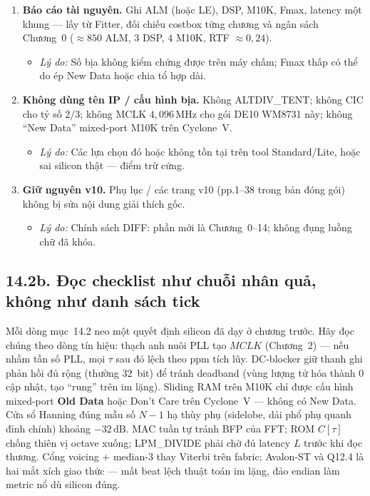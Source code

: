 \begin{enumerate}
\item \textbf{Báo cáo tài nguyên.} Ghi ALM (hoặc LE), DSP, M10K, Fmax, latency một khung --- lấy từ Fitter, đối chiếu costbox từng chương và ngân sách Chương~0 ($\approx 850$ ALM, $3$ DSP, $4$ M10K, RTF $\approx 0{,}24$).
\begin{itemize}[leftmargin=1.2em]
    \item \emph{Lý do:} Số bịa không kiểm chứng được trên máy chấm; Fmax thấp có thể do ép New Data hoặc chia tổ hợp dài.
\end{itemize}

\item \textbf{Không dùng tên IP / cấu hình bịa.} Không ALTDIV\_TENT; không CIC cho tỷ số $2/3$; không MCLK $4{,}096\,\text{MHz}$ cho gói DE10 WM8731 này; không ``New Data'' mixed-port M10K trên Cyclone~V.
\begin{itemize}[leftmargin=1.2em]
    \item \emph{Lý do:} Các lựa chọn đó hoặc không tồn tại trên tool Standard/Lite, hoặc sai silicon thật --- điểm trừ cứng.
\end{itemize}

\item \textbf{Giữ nguyên v10.} Phụ lục / các trang v10 (pp.1--38 trong bản đóng gói) không bị sửa nội dung giải thích gốc.
\begin{itemize}[leftmargin=1.2em]
    \item \emph{Lý do:} Chính sách DIFF: phần mới là Chương~0--14; không đụng luồng chữ đã khóa.
\end{itemize}
\end{enumerate}


\subsection*{14.2b. Đọc checklist như chuỗi nhân quả, không như danh sách tick}

Mỗi dòng mục~14.2 neo một quyết định silicon đã dạy ở chương trước. Hãy đọc chúng theo dòng tín hiệu: thạch anh nuôi PLL tạo $MCLK$ (Chương~2) --- nếu nhầm tần số PLL, mọi $\tau$ sau đó lệch theo ppm tích lũy. DC-blocker giữ thanh ghi phản hồi đủ rộng (thường $32$~bit) để tránh deadband (vùng lượng tử hóa thành $0$ cập nhật, tạo ``rung'' trên im lặng). Sliding RAM trên M10K chỉ được cấu hình mixed-port \textbf{Old Data} hoặc Don't Care trên Cyclone~V --- không có New Data. Cửa sổ Hanning đúng mẫu số $N-1$ hạ thùy phụ (sidelobe, dải phổ phụ quanh đỉnh chính) khoảng $-32\,\text{dB}$. MAC tuần tự tránh BFP của FFT; ROM $C[\tau]$ chống thiên vị octave xuống; LPM\_DIVIDE phải chờ đủ latency $L$ trước khi đọc thương. Cổng voicing + median-3 thay Viterbi trên fabric; Avalon-ST và Q12.4 là hai mắt xích giao thức --- mất beat lệch thuật toán im lặng, đảo endian làm metric nổ dù silicon đúng.

